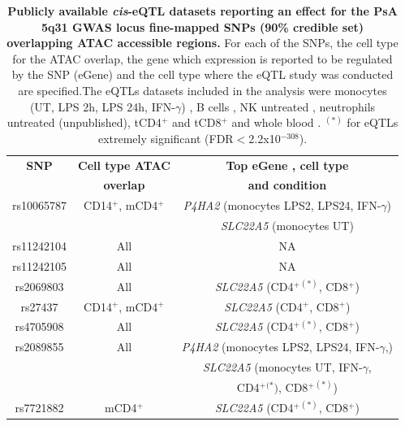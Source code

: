 \begin{table}[htbp]
\centering
\begin{tabular}{@{} c c c}
\toprule
\textbf{SNP} & \textbf{Cell type ATAC}   & \textbf{Top eGene , cell type } \\
             & \textbf{overlap}          & \textbf{and condition}  \\
\midrule
\midrule
rs10065787   & CD14$^+$, mCD4$^+$        & \textit{P4HA2} (monocytes LPS2, LPS24, IFN-$\gamma$) \\
             &                           &  \textit{SLC22A5} (monocytes UT) \\
rs11242104   & All                       &     NA        \\ 
rs11242105   & All                       &     NA   \\
rs2069803    & All                       & \textit{SLC22A5} (CD4$^+$$^{(\ast)}$, CD8$^+$) \\   
rs27437      & CD14$^+$, mCD4$^+$        & \textit{SLC22A5} (CD4$^+$, CD8$^+$) \\ 
rs4705908    & All                       & \textit{SLC22A5} (CD4$^+$$^{(\ast)}$, CD8$^+$) \\
rs2089855    & All                  & \textit{P4HA2} (monocytes LPS2, LPS24, IFN-$\gamma$,) \\
             &                           & \textit{SLC22A5} (monocytes UT, IFN-$\gamma$,\\
						 &                           & CD4$^+$$^{(\ast})$, CD8$^+$$^{(\ast)}$)  \\
rs7721882    & mCD4$^+$                  & \textit{SLC22A5} (CD4$^+$$^{(\ast)}$, CD8$^+$) \\									
\bottomrule
\end{tabular}
\medskip %
\caption[Publicly available \textit{cis}-eQTL datasets reporting an effect for the PsA 5q31 GWAS locus fine-mapped SNPs (90\% credible set) overlapping ATAC accessible regions.]{\textbf{Publicly available \textit{cis}-eQTL datasets reporting an effect for the PsA 5q31 GWAS locus fine-mapped SNPs (90\% credible set) overlapping ATAC accessible regions.} For each of the SNPs, the cell type for the ATAC overlap, the gene which expression is reported to be regulated by the SNP (eGene) and the cell type where the eQTL study was conducted are specified.The eQTLs datasets included in the analysis were monocytes (UT, LPS 2h, LPS 24h, IFN-$\gamma$) \parencite{Fairfax2014}, B cells \parencite{Fairfax2012}, NK untreated \parencite{Naranbhai2015}, neutrophils untreated (unpublished), tCD4$^+$ and tCD8$^+$ \parencite{Kasela2017} and whole blood \parencite{Jansen2017}. $^{(\ast)}$ for eQTLs extremely significant (FDR$<$2.2x10$^{-308}$).}
\label{tab:5q31_SNPs_ATAC_eQTL}
\end{table}

